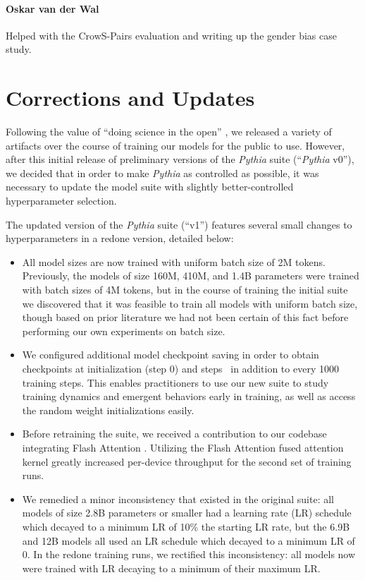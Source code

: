 \documentclass{article}
\theoremstyle{plain}
\theoremstyle{definition}
\theoremstyle{remark}
\begin{document}
\paragraph{Oskar van der Wal} Helped with the CrowS-Pairs evaluation and writing up the gender bias case study.

\section{Corrections and Updates}\label{app:corrections}

Following the value of ``doing science in the open'' \citep{phang2022eleutherai}, we released a variety of artifacts over the course of training our models for the public to use. However, after this initial release of preliminary versions of the \textit{Pythia} suite (``\textit{Pythia} v0''), we decided that in order to make \textit{Pythia} as controlled as possible, it was necessary to update the model suite with slightly better-controlled hyperparameter selection.

The updated version of the \textit{Pythia} suite (``v1'') features several small changes to hyperparameters in a redone version, detailed below:

\begin{itemize}
    \item All model sizes are now trained with uniform batch size of 2M tokens. Previously, the models of size 160M, 410M, and 1.4B parameters were trained with batch sizes of 4M tokens, but in the course of training the initial suite we discovered that it was feasible to train all models with uniform batch size, though based on prior literature we had not been certain of this fact before performing our own experiments on batch size.
    \item We configured additional model checkpoint saving in order to obtain checkpoints at initialization (step 0) and steps~ in addition to every 1000 training steps. This enables practitioners to use our new suite to study training dynamics and emergent behaviors early in training, as well as access the random weight initializations easily.
    \item Before retraining the suite, we received a contribution to our codebase integrating Flash Attention \citep{dao2022flashattention}. Utilizing the Flash Attention fused attention kernel greatly increased per-device throughput for the second set of training runs.
    \item We remedied a minor inconsistency that existed in the original suite: all models of size 2.8B parameters or smaller had a learning rate (LR) schedule which decayed to a minimum LR of 10\% the starting LR rate, but the 6.9B and 12B models all used an LR schedule which decayed to a minimum LR of 0. In the redone training runs, we rectified this inconsistency: all models now were trained with LR decaying to a minimum of  their maximum LR.
\end{itemize}
\end{document}
